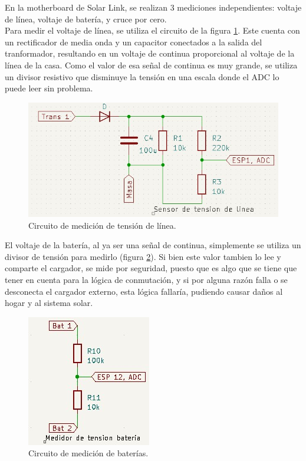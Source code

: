 En la motherboard de Solar Link, se realizan 3 mediciones independientes: voltaje de línea, voltaje de batería, y cruce por cero.\\

Para medir el voltaje de línea, se utiliza el circuito de la figura \ref{fig:Vlinea}. Este cuenta con un rectificador de media onda y un capacitor conectados a la salida del tranformador, resultando en un voltaje de continua proporcional al voltaje de la línea de la casa. Como el valor de esa señal de continua es muy grande, se utiliza un divisor resistivo que disminuye la tensión en una escala donde el ADC lo puede leer sin problema.\\

\begin{figure}[H]
    \centering
    \includegraphics[width=0.9\linewidth]{hardware/Screenshot_14.jpg}
    \caption{Circuito de medición de tensión de línea.}
    \label{fig:Vlinea}
\end{figure}

El voltaje de la batería, al ya ser una señal de continua, simplemente se utiliza un divisor de tensión para medirlo (figura \ref{fig:Vbat}). Si bien este valor tambien lo lee y comparte el cargador, se mide por seguridad, puesto que es algo que se tiene que tener en cuenta para la lógica de conmutación, y si por alguna razón falla o se desconecta el cargador externo, esta lógica fallaría, pudiendo causar daños al hogar y al sistema solar.\\

\begin{figure}[H]
    \centering
    \includegraphics[width=0.5\linewidth]{hardware/Screenshot_16.jpg}
    \caption{Circuito de medición de baterías.}
    \label{fig:Vbat}
\end{figure}

